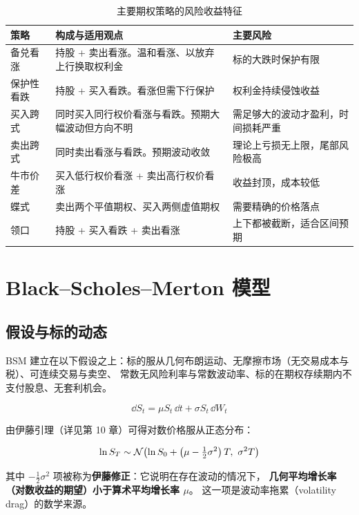\begin{table}[htbp]
\centering
\caption{主要期权策略的风险收益特征}\label{tab:04-strategies}
\tablefont
\begin{tabularx}{\textwidth}{@{}L{2.8cm}Y L{3.6cm}@{}}
\toprule
\textbf{策略} & \textbf{构成与适用观点} & \textbf{主要风险} \\
\midrule
备兑看涨 & 持股 + 卖出看涨。温和看涨、以放弃上行换取权利金 & 标的大跌时保护有限 \\
保护性看跌 & 持股 + 买入看跌。看涨但需下行保护 & 权利金持续侵蚀收益 \\
买入跨式 & 同时买入同行权价看涨与看跌。预期大幅波动但方向不明 & 需足够大的波动才盈利，时间损耗严重 \\
卖出跨式 & 同时卖出看涨与看跌。预期波动收敛 & 理论上亏损无上限，尾部风险极高 \\
牛市价差 & 买入低行权价看涨 + 卖出高行权价看涨 & 收益封顶，成本较低 \\
蝶式 & 卖出两个平值期权、买入两侧虚值期权 & 需要精确的价格落点 \\
领口 & 持股 + 买入看跌 + 卖出看涨 & 上下都被截断，适合区间预期 \\
\bottomrule
\end{tabularx}
\end{table}

\section{Black--Scholes--Merton 模型}

\subsection{假设与标的动态}

BSM 建立在以下假设之上：标的服从几何布朗运动、无摩擦市场（无交易成本与税）、可连续交易与卖空、
常数无风险利率与常数波动率、标的在期权存续期内不支付股息、无套利机会。

\begin{equation}
  \dd S_t = \mu S_t\,\dd t + \sigma S_t\,\dd W_t
  \label{eq:04-gbm}
\end{equation}

由伊藤引理（详见第 10 章）可得对数价格服从正态分布：

\begin{equation}
  \ln S_T \sim \mathcal{N}\!\left(\ln S_0 + \left(\mu-\tfrac12\sigma^2\right)T,\ \sigma^2T\right)
  \label{eq:04-lognormal}
\end{equation}

其中 $-\tfrac12\sigma^2$ 项被称为\textbf{伊藤修正}：它说明在存在波动的情况下，
\textbf{几何平均增长率（对数收益的期望）小于算术平均增长率 $\mu$}。
这一项是波动率拖累（volatility drag）的数学来源。

